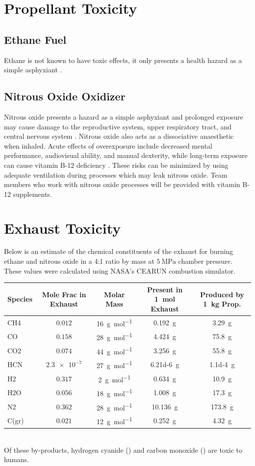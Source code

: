 \documentclass{article}
\begin{document}
\section{Propellant Toxicity}
\subsection{Ethane Fuel}
Ethane is not known to have toxic effects, it only presents a health hazard as a simple asphyxiant \cite{EthaneMSDS}.
\subsection{Nitrous Oxide Oxidizer}
Nitrous oxide presents a hazard as a simple asphyxiant and prolonged exposure may cause damage to the reproductive system, upper respiratory tract, and central nervous system \cite{N2OMSDS}. Nitrous oxide also acts as a dissociative anaesthetic when inhaled. Acute effects of overexposure include decreased mental performance, audiovisual ability, and manual dexterity, while long-term exposure can cause vitamin B-12 deficiency \cite{NIOSH}. These risks can be minimized by using adequate ventilation during processes which may leak nitrous oxide. Team members who work with nitrous oxide processes will be provided with vitamin B-12 supplements.

\section{Exhaust Toxicity}
Below is an estimate of the chemical constituents of the exhaust for burning ethane and nitrous oxide in a 4:1 ratio by mass at $\SI{5}{\mega\pascal}$ chamber pressure.
These values were calculated using NASA's CEARUN combustion simulator.\\
\begin{tabular}{ l | c | c | c | c }
Species & Mole Frac in Exhaust & Molar Mass & Present in \SI{1}{\mole} Exhaust & Produced by \SI{1}{\kg} Prop.\\
\hline
CH4 & $0.012$ & \SI{16}{\gram\per\mole} & \SI{0.192}{\gram} & \SI{3.29}{\gram} \\
CO  & $0.158$ & \SI{28}{\gram\per\mole} & \SI{4.424}{\gram} & \SI{75.8}{\gram} \\
CO2 & $0.074$ & \SI{44}{\gram\per\mole} & \SI{3.256}{\gram} & \SI{55.8}{\gram} \\
HCN & $\num{2.3e-7}$& \SI{27}{\gram\per\mole} & \SI{6.21d-6}{\gram} & \SI{1.1d-4}{\gram} \\
H2  & $0.317$ & \SI{2}{\gram\per\mole}  & \SI{0.634}{\gram} & \SI{10.9}{\gram} \\
H2O & $0.056$ & \SI{18}{\gram\per\mole} & \SI{1.008}{\gram} & \SI{17.3}{\gram} \\
N2  & $0.362$ & \SI{28}{\gram\per\mole} & \SI{10.136}{\gram} & \SI{173.8}{\gram} \\
C(gr)&$0.021$ & \SI{12}{\gram\per\mole} & \SI{0.252}{\gram} & \SI{4.32}{\gram} \\
\end{tabular}
\\
Of these by-products, hydrogen cyanide () and carbon monoxide () are toxic to humans.\\
\end{document}
